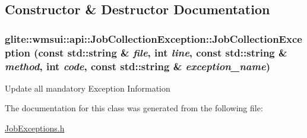 \subsection{Constructor \& Destructor Documentation}
\hypertarget{classglite_1_1wmsui_1_1api_1_1JobCollectionException_a0}{
\subsubsection[JobCollectionException]{\setlength{\rightskip}{0pt plus 5cm}glite::wmsui::api::Job\-Collection\-Exception::Job\-Collection\-Exception (const std::string \& {\em file}, int {\em line}, const std::string \& {\em method}, int {\em code}, const std::string \& {\em exception\_\-name})}}
\label{classglite_1_1wmsui_1_1api_1_1JobCollectionException_a0}


Update all mandatory Exception Information 

The documentation for this class was generated from the following file:\begin{CompactItemize}
\item 
\hyperlink{JobExceptions_8h}{Job\-Exceptions.h}\end{CompactItemize}
